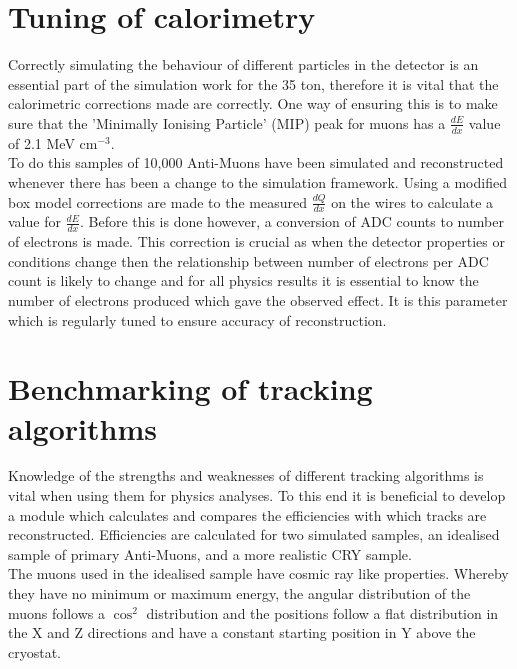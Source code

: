 \documentclass[11pt]{report} %
\begin{document}
{\section{Tuning of calorimetry}
Correctly simulating the behaviour of different particles in the detector is an essential part of the simulation work for the 35 ton, therefore it is vital that the calorimetric corrections made are correctly. One way of ensuring this is to make sure that the 'Minimally Ionising Particle' (MIP) peak for muons has a \( \frac{dE}{dx} \) value of 2.1 MeV cm\(^{-3}\). \\

To do this samples of 10,000 Anti-Muons have been simulated and reconstructed whenever there has been a change to the simulation framework. Using a modified box model \cite{ModBox} corrections are made to the measured \( \frac{dQ}{dx} \) on the wires to calculate a value for \( \frac{dE}{dx} \). Before this is done however, a conversion of ADC counts to number of electrons is made. This correction is crucial as when the detector properties or conditions change then the relationship between number of electrons per ADC count is likely to change and for all physics results it is essential to know the number of electrons produced which gave the observed effect. It is this parameter which is regularly tuned to ensure accuracy of reconstruction.

\section{Benchmarking of tracking algorithms}
Knowledge of the strengths and weaknesses of different tracking algorithms is vital when using them for physics analyses. To this end it is beneficial to develop a module which calculates and compares the efficiencies with which tracks are reconstructed. Efficiencies are calculated for two simulated samples, an idealised sample of primary Anti-Muons, and a more realistic CRY sample. \\ 

The muons used in the idealised sample have cosmic ray like properties. Whereby they have no minimum or maximum energy, the angular distribution of the muons follows a $\cos^2$ distribution and the positions follow a flat distribution in the X and Z directions and have a constant starting position in Y above the cryostat. \\

}
\end{document}
